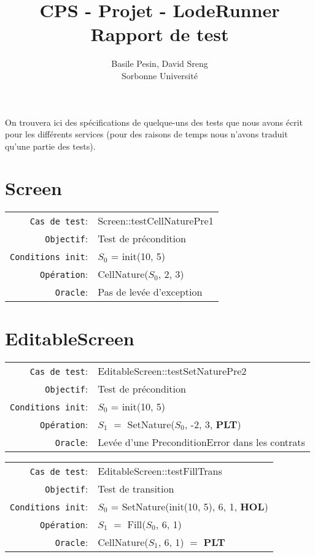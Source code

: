 \documentclass{article}
\title{CPS - Projet - LodeRunner\\Rapport de test}
\author{Basile Pesin, David Sreng\\Sorbonne Université}
\begin{document}
\maketitle

On trouvera ici des spécifications de quelque-uns des tests que nous avons écrit pour les différents services (pour des raisons de temps nous n'avons traduit qu'une partie des tests).

\section{Screen}

{\small
  \begin{longtable}{rl}
    \texttt{Cas de test}: &\textrm{Screen::testCellNaturePre1}\\
    \texttt{Objectif}: & Test de précondition\\
    \texttt{Conditions init}: & $S_0$ = \textrm{init(10, 5)}\\
    \texttt{Opération}: &\textrm{CellNature($S_0$, 2, 3)}\\
    \texttt{Oracle}: & Pas de levée d'exception\\
  \end{longtable}}

\section{EditableScreen}

{\small
  \begin{longtable}{rl}
    \texttt{Cas de test}: &\textrm{EditableScreen::testSetNaturePre2}\\
    \texttt{Objectif}: & Test de précondition\\
    \texttt{Conditions init}: & $S_0$ = \textrm{init(10, 5)}\\
    \texttt{Opération}: &$S_1$ $=$ \textrm{SetNature($S_0$, -2, 3, \textbf{PLT})}\\
    \texttt{Oracle}: & Levée d'une \textrm{PreconditionError} dans les contrats\\
  \end{longtable}}

{\small
  \begin{longtable}{rl}
    \texttt{Cas de test}: &\textrm{EditableScreen::testFillTrans}\\
    \texttt{Objectif}: & Test de transition\\
    \texttt{Conditions init}: & $S_0$ = \textrm{SetNature(init(10, 5), 6, 1, \textbf{HOL})}\\
    \texttt{Opération}: &$S_1$ $=$ \textrm{Fill($S_0$, 6, 1)}\\
    \texttt{Oracle}: &\textrm{CellNature($S_1$, 6, 1)} $=$ \textbf{PLT}\\
  \end{longtable}}
\end{document}
